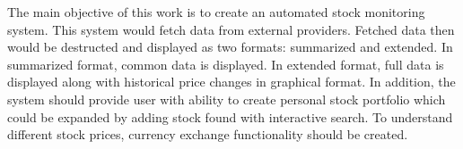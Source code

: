 The main objective of this work is to create an automated stock monitoring system. This system would fetch data from external providers. Fetched data then would be destructed and displayed as two formats: summarized and extended. In summarized format, common data is displayed. In extended format, full data is displayed along with historical price changes in graphical format. In addition, the system should provide user with ability to create personal stock portfolio which could be expanded by adding stock found with interactive search. To understand different stock prices, currency exchange functionality should be created.